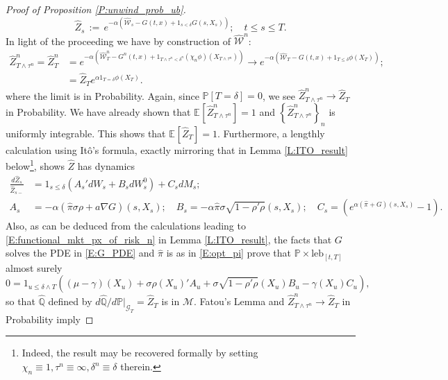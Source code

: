 \documentclass[11pt, letterpaper]{amsart}
\theoremstyle{definition}
\theoremstyle{remark}
\numberwithin{equation}{section}
\newcommand{\We}{\mathcal{W}}
\newcommand{\hwe}{\hat{\We}}
\newcommand{\hz}{\hat{Z}}
\newcommand{\hqprob}{\hat{\qprob}}
\newcommand{\hpi}{\hat{\pi}}
\newcommand{\prob}{\mathbb{P}}
\newcommand{\qprob}{\mathbb{Q}}
\newcommand{\esp}{\mathbb{E}}
\newcommand{\espalt}[2]{\esp^{#1}\bra{#2}}
\newcommand{\G}{\mathcal{G}}
\newcommand{\M}{\mathcal{M}}
\newcommand{\dfn}{\, := \,}
\newcommand{\bra}[1]{\left[#1\right]}
\newcommand{\cbra}[1]{\left\{#1\right\}}
\newcommand{\ito}{It\^{o}}
\begin{document}
\begin{proof}[Proof of Proposition \ref{P:unwind_prob_ub}]
\begin{equation}\label{E:hat_Z_a}
\hz_s \dfn  e^{-\alpha (\hwe_s - G(t,x) + 1_{s<\delta} G(s,X_s))};\quad t\leq s\leq T.
\end{equation}
In light of the proceeding we have by construction of $\hwe^n$:
\begin{equation*}
\begin{split}
\hz^n_{T\wedge\tau^n} = \hz^n_T &= e^{-\alpha(\hwe^n_T - G^n(t,x) + 1_{T\wedge\tau^n < \delta^n} (\chi_n\phi)(X_{T\wedge\tau^n}))} \rightarrow e^{-\alpha(\hwe_T - G(t,x) + 1_{T\leq \delta}\phi(X_T))};\\
&= \hz_T e^{\alpha 1_{T=\delta}\phi(X_T)}.
\end{split}
\end{equation*}
where the limit is in Probability. Again, since $\prob\bra{T=\delta} = 0$, we see $\hz^n_{T\wedge\tau^n}\rightarrow \hz_T$ in Probability. We have already shown that $\espalt{}{\hz^n_{T\wedge\tau^n}} = 1$ and  $\cbra{\hz^n_{T\wedge\tau^n}}_{n}$ is uniformly integrable.  This shows that $\espalt{}{\hz_T} = 1$.  Furthermore, a lengthly calculation using \ito's formula, exactly mirroring that in Lemma \ref{L:ITO_result} below\footnote{Indeed, the result may be recovered formally by setting $\chi_n\equiv 1, \tau^n\equiv\infty, \delta^n\equiv \delta$ therein.}, shows $\hz$ has dynamics
\begin{equation}\label{E:Z_form}
\begin{split}
\frac{d\hz_s}{\hz_{s-}} &= 1_{s\leq\delta}\left(A_s'dW_s + B_s dW^0_s\right) + C_s dM_s;\\
A_s &= -\alpha \left(\hpi\sigma\rho + a\nabla G\right)(s,X_s);\quad B_s = -\alpha \hpi\sigma\sqrt{1-\rho'\rho}(s,X_s);\quad C_s = \left(e^{\alpha\left(\hpi + G\right)(s,X_s)}-1\right).
\end{split}
\end{equation}
Also, as can be deduced from the calculations leading to \eqref{E:functional_mkt_px_of_risk_n} in Lemma \ref{L:ITO_result}, the facts that $G$ solves the PDE in \eqref{E:G_PDE} and $\hpi$ is as in \eqref{E:opt_pi} prove that $\prob\times\textrm{leb}_{[t,T]}$ almost surely
\begin{equation*}
0 = 1_{u\leq \delta\wedge T}\left((\mu-\gamma)(X_u) + \sigma\rho(X_u)'A_u + \sigma\sqrt{1-\rho'\rho}(X_u)B_u - \gamma(X_u)C_u\right),
\end{equation*}
so that $\hqprob$ defined by $d\hqprob/d\prob|_{\G_T} = \hz_T$ is in $\M$.  Fatou's Lemma and $\hz^n_{T\wedge\tau^n}\rightarrow \hz_T$ in Probability imply

\end{proof}
\end{document}
